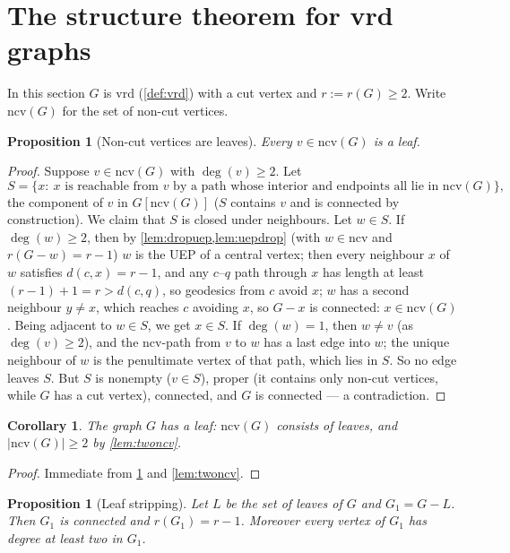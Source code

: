 \documentclass[11pt]{article}
\newtheorem{proposition}[theorem]{Proposition}
\newtheorem{corollary}[theorem]{Corollary}
\theoremstyle{definition}
\newcommand{\NC}{\mathrm{ncv}}
\begin{document}
\section{The structure theorem for vrd graphs}\label{sec:vrd}

In this section $G$ is vrd (\cref{def:vrd}) with a cut vertex and
$r:=r(G)\ge2$.  Write $\NC(G)$ for the set of non-cut vertices.

\begin{proposition}[Non-cut vertices are leaves]\label{prop:ncvleaf}
Every $v\in\NC(G)$ is a leaf.
\end{proposition}

\begin{proof}
Suppose $v\in\NC(G)$ with $\deg(v)\ge2$.  Let
\[
 S=\{x:\ x\text{ is reachable from }v\text{ by a path whose interior and
 endpoints all lie in }\NC(G)\},
\]
the component of $v$ in $G[\NC(G)]$ ($S$ contains $v$ and is connected by
construction).  We claim that $S$ is closed under neighbours.  Let $w\in S$.
If $\deg(w)\ge2$, then by \cref{lem:dropuep,lem:uepdrop}
(with $w\in\NC$ and $r(G-w)=r-1$) $w$ is the UEP of a central vertex;
then every neighbour $x$ of $w$ satisfies $d(c,x)=r-1$, and any
$c$--$q$ path through $x$ has length at least $(r-1)+1=r>d(c,q)$, so
geodesics from $c$ avoid $x$; $w$ has a second neighbour $y\ne x$,
which reaches $c$ avoiding $x$, so $G-x$ is connected:
$x\in\NC(G)$.  Being adjacent to $w\in S$, we get $x\in S$.
If $\deg(w)=1$, then $w\ne v$ (as $\deg(v)\ge2$), and the $\NC$-path
from $v$ to $w$ has a last edge into $w$; the unique neighbour of $w$
is the penultimate vertex of that path, which lies in $S$.
So no edge leaves $S$.  But $S$ is nonempty ($v\in S$), proper (it contains
only non-cut vertices, while $G$ has a cut vertex), connected, and $G$ is
connected --- a contradiction.
\end{proof}

\begin{corollary}\label{cor:ncvleaf}
The graph $G$ has a leaf: $\NC(G)$ consists of leaves, and $|\NC(G)|\ge2$ by
\cref{lem:twoncv}.
\end{corollary}

\begin{proof}
Immediate from \cref{prop:ncvleaf} and \cref{lem:twoncv}.
\end{proof}

\begin{proposition}[Leaf stripping]\label{prop:strip}
Let $L$ be the set of leaves of $G$ and $G_1=G-L$.  Then $G_1$ is connected
and $r(G_1)=r-1$.  Moreover every vertex of $G_1$ has degree at least two in
$G_1$.
\end{proposition}
\end{document}
